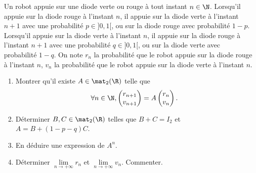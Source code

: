 \begin{enonce}
\begin{exercise}[ID={RMS135 E1331},subtitle={Centrale PSI 2024},tags={oraux},difficulty={}]
Un robot appuie sur une diode verte ou rouge à tout instant $n\in\N$.
  Lorsqu'il appuie sur la diode rouge à l'instant $n$, il appuie sur la diode verte à l'instant $n+1$ avec une probabilité $p\in]0,1[$, ou sur la diode rouge avec probabilité $1-p$.
  Lorsqu'il appuie sur la diode verte à l'instant $n$, il appuie sur la diode rouge à l'instant $n+1$ avec une probabilité $q\in]0,1[$, ou sur la diode verte avec probabilité $1-q$.
  On note $r_n$ la probabilité que le robot appuie sur la diode rouge à l'instant $n$, $v_n$ la probabilité que le robot appuie sur la diode verte à l'instant $n$.

  \begin{enumerate}
    \item Montrer qu'il existe $A\in\mat_2(\R)$ telle que
      \begin{equation*}
        \forall n\in\N, \begin{pmatrix} r_{n+1}\\ v_{n+1} \end{pmatrix} = A \begin{pmatrix} r_n \\ v_n \end{pmatrix}.
      \end{equation*}

    \item Déterminer $B, C\in\mat_2(\R)$ telles que $B+C=I_2$ et $A = B + (1-p-q) C$.

    \item En déduire une expression de $A^n$.

    \item Déterminer $\lim\limits_{n\to+\infty} r_n$ et $\lim\limits_{n\to+\infty} v_n$.
      Commenter.
  \end{enumerate}
\end{exercise}
\begin{solution}
\end{solution}
\end{enonce}
